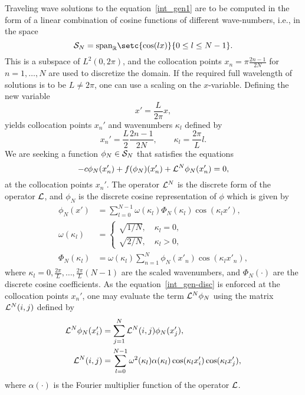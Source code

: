 Traveling wave solutions to the equation~\eqref{int_gen1}
are to be computed in the form of a linear combination of cosine functions of different
wave-numbers, i.e., in the space
\begin{equation}
\SN = \mathrm{span}_{\R}\setc{\cos(lx)}{0 \leq l \leq N-1 }
.
\end{equation}
This is a subspace of $L^2(0,2\pi)$, and the collocation points 
$x_n = \pi \frac{2n -1}{2N}$ for $n = 1,\dots, N$ are used to discretize the domain.  
If the required full wavelength of solutions is to be $L \neq 2\pi$, 
one can use a scaling on the $x$-variable. 
Defining the new variable
\begin{equation*}
x' = \frac{L}{2\pi}x, 
\end{equation*}
yields collocation points $x_n'$ and wavenumbers $\kappa_l$ defined by
\begin{equation*}
x_n' = \frac{L}{2} \frac{2n -1}{2N}, \quad\quad \kappa_l = \frac{2\pi}{L}l. 
\end{equation*}
We are seeking a function $\phi_N \in \mathcal{S}_N$ that satisfies the equations
\begin{equation}
-c\phi_N(x_n') + f(\phi_N)(x_n') + \mathcal{L}^N\phi_N(x_n') = 0, \label{int_gen-disc}
\end{equation}
at the collocation points $x_n'$.
The operator $\mathcal{L}^N$ is the discrete form of the operator $\mathcal{L}$, 
and $\phi_N$ is the discrete cosine representation of $\phi$
which is given by
\begin{align*}
\phi_N(x') &= \sum_{l = 0}^{N-1} \omega(\kappa_l)\Phi_N(\kappa_l)\cos(\kappa_{l}x'),\\
\omega(\kappa_l) &= 
\begin{cases}
\sqrt{1/N}, \quad \kappa_l = 0, \\
\sqrt{2/N}, \quad \kappa_l > 0,
\end{cases}                  \\
\Phi_N(\kappa_l) &= \omega(\kappa_l) \sum_{n = 1}^{N} \phi_N(x'_n) \cos(\kappa_l x'_n),
\end{align*}
where $\kappa_l = 0,\frac{2\pi}{L},\ldots, \frac{2\pi}{L}(N-1)$ are the scaled wavenumbers,
and $\Phi_N(\cdot)$ are the discrete cosine coefficients.
As the equation~\eqref{int_gen-disc} is enforced at the collocation points $x_n'$, 
one may evaluate the term $\mathcal{L}^N\phi_N$ using the matrix $\mathcal{L}^N(i,j)$ 
defined by
\begin{align*}
\mathcal{L}^N\phi_N(x'_i) &= \sum_{j=1}^{N}\mathcal{L}^N(i,j) \phi_N(x'_j),\\
\mathcal{L}^N(i,j) &= \sum_{l=0}^{N-1} \omega^2(\kappa_l) \alpha(\kappa_l) \cos(\kappa_l x'_i) \cos(\kappa_l x'_j),
\end{align*}
where $\alpha(\cdot)$ is the Fourier multiplier function of the operator $\mathcal{L}$.




